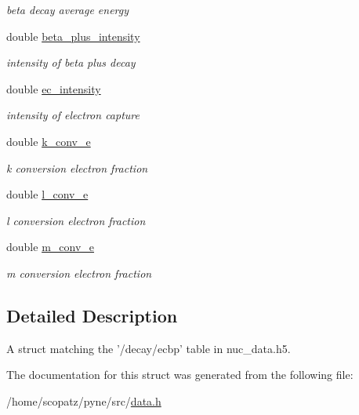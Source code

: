 \begin{DoxyCompactItemize}
\begin{DoxyCompactList}\small\item\em beta decay average energy \end{DoxyCompactList}\item 
\hypertarget{structpyne_1_1ecbp_adafb0b96525249576ccc33302c452fe8}{double \hyperlink{structpyne_1_1ecbp_adafb0b96525249576ccc33302c452fe8}{beta\-\_\-plus\-\_\-intensity}}\label{structpyne_1_1ecbp_adafb0b96525249576ccc33302c452fe8}

\begin{DoxyCompactList}\small\item\em intensity of beta plus decay \end{DoxyCompactList}\item 
\hypertarget{structpyne_1_1ecbp_a67128407e1bd8eb131b7b2764a6813d8}{double \hyperlink{structpyne_1_1ecbp_a67128407e1bd8eb131b7b2764a6813d8}{ec\-\_\-intensity}}\label{structpyne_1_1ecbp_a67128407e1bd8eb131b7b2764a6813d8}

\begin{DoxyCompactList}\small\item\em intensity of electron capture \end{DoxyCompactList}\item 
\hypertarget{structpyne_1_1ecbp_a3bb382193d514ddbda7baf4796a025d5}{double \hyperlink{structpyne_1_1ecbp_a3bb382193d514ddbda7baf4796a025d5}{k\-\_\-conv\-\_\-e}}\label{structpyne_1_1ecbp_a3bb382193d514ddbda7baf4796a025d5}

\begin{DoxyCompactList}\small\item\em k conversion electron fraction \end{DoxyCompactList}\item 
\hypertarget{structpyne_1_1ecbp_a4de2fa13e0520b5fd840cc53ad8f52dd}{double \hyperlink{structpyne_1_1ecbp_a4de2fa13e0520b5fd840cc53ad8f52dd}{l\-\_\-conv\-\_\-e}}\label{structpyne_1_1ecbp_a4de2fa13e0520b5fd840cc53ad8f52dd}

\begin{DoxyCompactList}\small\item\em l conversion electron fraction \end{DoxyCompactList}\item 
\hypertarget{structpyne_1_1ecbp_afed47f1b2eea323a4de63f67fdd236c6}{double \hyperlink{structpyne_1_1ecbp_afed47f1b2eea323a4de63f67fdd236c6}{m\-\_\-conv\-\_\-e}}\label{structpyne_1_1ecbp_afed47f1b2eea323a4de63f67fdd236c6}

\begin{DoxyCompactList}\small\item\em m conversion electron fraction \end{DoxyCompactList}\end{DoxyCompactItemize}


\subsection{Detailed Description}
A struct matching the '/decay/ecbp' table in nuc\-\_\-data.\-h5. 

The documentation for this struct was generated from the following file\-:\begin{DoxyCompactItemize}
\item 
/home/scopatz/pyne/src/\hyperlink{data_8h}{data.\-h}\end{DoxyCompactItemize}
